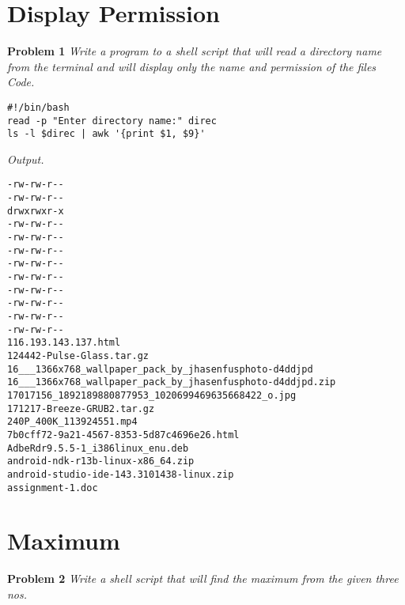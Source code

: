 \documentclass[12pt]{article}
\date{ }
\begin{document}
\tableofcontents

\newpage

\setlength{\fboxrule}{.5mm}\setlength{\fboxsep}{1.2mm}
\newlength{\boxlength}\setlength{\boxlength}{\textwidth}
\addtolength{\boxlength}{-4mm}
\begin{center}\end{center}
\vspace{5mm}

\section{Display Permission}

\textbf{Problem 1} \textit{Write a program to a shell script that will read a directory name from the terminal and will display only the name
	and permission of the files}\\

\textit{Code.}

\begin{lstlisting}
#!/bin/bash
read -p "Enter directory name:" direc
ls -l $direc | awk '{print $1, $9}'
\end{lstlisting}

\textit{Output.}
\begin{lstlisting}
-rw-rw-r--
-rw-rw-r--
drwxrwxr-x
-rw-rw-r--
-rw-rw-r--
-rw-rw-r--
-rw-rw-r--
-rw-rw-r--
-rw-rw-r--
-rw-rw-r--
-rw-rw-r--
-rw-rw-r--
116.193.143.137.html
124442-Pulse-Glass.tar.gz
16___1366x768_wallpaper_pack_by_jhasenfusphoto-d4ddjpd
16___1366x768_wallpaper_pack_by_jhasenfusphoto-d4ddjpd.zip
17017156_1892189880877953_1020699469635668422_o.jpg
171217-Breeze-GRUB2.tar.gz
240P_400K_113924551.mp4
7b0cff72-9a21-4567-8353-5d87c4696e26.html
AdbeRdr9.5.5-1_i386linux_enu.deb
android-ndk-r13b-linux-x86_64.zip
android-studio-ide-143.3101438-linux.zip
assignment-1.doc
\end{lstlisting}

\section{Maximum}

\textbf{Problem 2} \textit{Write a shell script that will find the maximum from the given three nos.}\\
\end{document}
